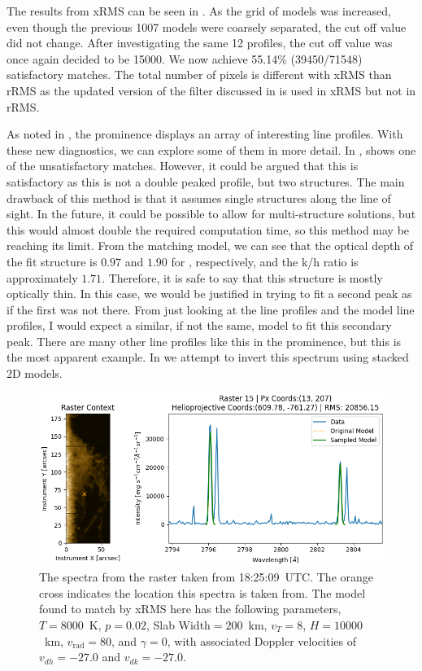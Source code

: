 The results from xRMS can be seen in . As the grid of models was increased, even though the previous 1007 models were coarsely separated, the cut off value did not change. After investigating the same 12 profiles, the cut off value was once again decided to be 15000. We now achieve 55.14\% (39450/71548) satisfactory matches. The total number of pixels is different with xRMS than rRMS as the updated version of the filter discussed in  is used in xRMS but not in rRMS. 

As noted in , the prominence displays an array of interesting line profiles. With these new diagnostics, we can explore some of them in more detail. In , shows one of the unsatisfactory matches. However, it could be argued that this is satisfactory as this is not a double peaked profile, but two structures. The main drawback of this method is that it assumes single structures along the line of sight. In the future, it could be possible to allow for multi-structure solutions, but this would almost double the required computation time, so this method may be reaching its limit. From the matching model, we can see that the optical depth of the fit structure is $0.97$ and $1.90$ for \mgiihk{}, respectively, and the k/h ratio is approximately $1.71$. Therefore, it is safe to say that this structure is mostly optically thin. In this case, we would be justified in trying to fit a second peak as if the first was not there. From just looking at the line profiles and the model line profiles, I would expect a similar, if not the same, model to fit this secondary peak. There are many other line profiles like this in the prominence, but this is the most apparent example. In  we attempt to invert this spectrum using stacked 2D models.

\begin{figure}
    \includegraphics[width=\linewidth]{./02Modelling1D/figs/lineprofs/r15y13x207.png}
    \caption[The \mgiihk{} spectra from the raster taken from 18:25:09~UTC.]{The \mgiihk{} spectra from the raster taken from 18:25:09~UTC. The orange cross indicates the location this spectra is taken from. The model found to match by xRMS here has the following parameters, $T=8000$~K, $p=0.02$\dyncm{}, Slab Width$=200$~km, $v_T=8$\kms{}, $H=10000$~km, $v_\text{rad}=80$\kms{}, and $\gamma=0$, with associated Doppler velocities of $v_{dh}=-27.0$\kms{} and $v_{dk}=-27.0$\kms{}.}
    \label{2structs}
\end{figure}

